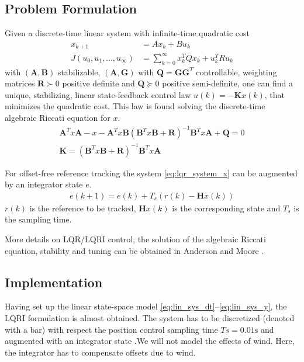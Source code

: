 \subsection{Problem Formulation}
Given a discrete-time linear system with infinite-time quadratic cost
\begin{align}
x_{k+1} &= Ax_k + Bu_k \label{eq:lqr_system_x}\\
J(u_0,u_1,...,u_\infty) &= \sum_{k=0}^\infty  x_k^TQx_k + u_k^TRu_k \label{eq:lqr_system_J}
\end{align} 
with $(\mathbf{A},\mathbf{B})$ stabilizable, $(\mathbf{A},\mathbf{G})$ with $\mathbf{Q}= \mathbf{G} \mathbf{G}^T$ controllable, weighting matrices $\mathbf{R}\succ0$ positive definite and $\mathbf{Q}\succeq0$ positive semi-definite, one can find a unique, stabilizing, linear state-feedback control law $u(k) = -\mathbf{K} x(k)$, that minimizes the quadratic cost.
This law is found solving the discrete-time algebraic Riccati equation for $x$.
\begin{align}
\mathbf{A}^Tx\mathbf{A} - x - \mathbf{A}^T x \mathbf{B} \left( \mathbf{B}^T x \mathbf{B} + \mathbf{R} \right)^{-1} \mathbf{B}^T x \mathbf{A} + \mathbf{Q} = 0 \\
\mathbf{K} = \left( \mathbf{B}^T x \mathbf{B} + \mathbf{R} \right)^{-1} \mathbf{B}^T x \mathbf{A}
\end{align}

For offset-free reference tracking the system \ref{eq:lqr_system_x} can be augmented by an integrator state $e$.
\begin{align}
e(k+1) = e(k) + {T_s} \left( r(k) - \mathbf{H}x(k) \right) \label{eq:lqr_system_e}
\end{align}
$r(k)$ is the reference to be tracked, $\mathbf{H}x(k)$ is the corresponding state and $T_s$ is the sampling time.

More details on LQR/LQRI control, the solution of the algebraic Riccati equation, stability and tuning can be obtained in Anderson and Moore \cite{Anderson2007}.

\subsection{Implementation}
Having set up the linear state-space model \ref{eq:lin_sys_dt}--\ref{eq:lin_sys_y}, the LQRI formulation is almost obtained. The system has to be discretized (denoted with a bar) with respect the position control sampling time $Ts=0.01\si{\second}$ and augmented with an integrator state .We will not model the effects of wind. Here, the integrator has to compensate offsets due to wind. 

